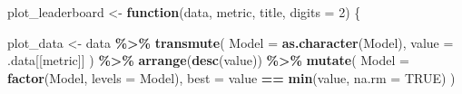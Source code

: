 \documentclass[
  english,
  11pt,
]{article}
\newenvironment{Shaded}{\begin{snugshade}}{\end{snugshade}}
\newcommand{\AttributeTok}[1]{\textcolor[rgb]{0.13,0.29,0.53}{#1}}
\newcommand{\ConstantTok}[1]{\textcolor[rgb]{0.56,0.35,0.01}{#1}}
\newcommand{\ControlFlowTok}[1]{\textcolor[rgb]{0.13,0.29,0.53}{\textbf{#1}}}
\newcommand{\DecValTok}[1]{\textcolor[rgb]{0.00,0.00,0.81}{#1}}
\newcommand{\FunctionTok}[1]{\textcolor[rgb]{0.13,0.29,0.53}{\textbf{#1}}}
\newcommand{\NormalTok}[1]{#1}
\newcommand{\OtherTok}[1]{\textcolor[rgb]{0.56,0.35,0.01}{#1}}
\newcommand{\SpecialCharTok}[1]{\textcolor[rgb]{0.81,0.36,0.00}{\textbf{#1}}}
\begin{document}
\begin{Shaded}
\begin{Highlighting}[]
\NormalTok{plot\_leaderboard }\OtherTok{\textless{}{-}} \ControlFlowTok{function}\NormalTok{(data, metric, title, }\AttributeTok{digits =} \DecValTok{2}\NormalTok{) \{}

\NormalTok{    plot\_data }\OtherTok{\textless{}{-}}\NormalTok{ data }\SpecialCharTok{\%\textgreater{}\%}
        \FunctionTok{transmute}\NormalTok{(}
            \AttributeTok{Model =} \FunctionTok{as.character}\NormalTok{(Model),}
            \AttributeTok{value =}\NormalTok{ .data[[metric]]}
\NormalTok{        ) }\SpecialCharTok{\%\textgreater{}\%}
        \FunctionTok{arrange}\NormalTok{(}\FunctionTok{desc}\NormalTok{(value)) }\SpecialCharTok{\%\textgreater{}\%}
        \FunctionTok{mutate}\NormalTok{(}
            \AttributeTok{Model =} \FunctionTok{factor}\NormalTok{(Model, }\AttributeTok{levels =}\NormalTok{ Model),}
            \AttributeTok{best =}\NormalTok{ value }\SpecialCharTok{==} \FunctionTok{min}\NormalTok{(value, }\AttributeTok{na.rm =} \ConstantTok{TRUE}\NormalTok{)}
\NormalTok{        )}


\end{Highlighting}
\end{Shaded}
\end{document}
